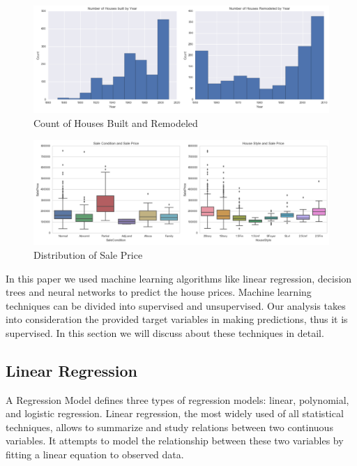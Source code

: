 \documentclass[fleqn,10pt]{SelfArx} %
\begin{document}
	\begin{figure}[ht]\centering %
		\includegraphics[width=\linewidth]{year}
		\caption{Count of Houses Built and Remodeled}
		\label{fig:year}
	\end{figure}
	\begin{figure}[ht]\centering %
		\includegraphics[width=\linewidth]{SalePrice}
		\caption{Distribution of Sale Price}
		\label{fig:SalePrice}
	\end{figure}
	
	In this paper we used machine learning algorithms like linear regression, decision trees and neural networks to predict the house prices. Machine learning techniques can be divided into supervised and unsupervised. Our analysis takes into consideration the provided target variables in making predictions, thus it is supervised. In this section we will discuss about these techniques in detail.
	
	\subsection{Linear Regression}
	
	A Regression Model defines three types of regression models: linear, polynomial, and logistic regression. Linear regression, the most widely used of all statistical techniques, allows to summarize and study relations between two continuous variables\cite{stat}. It attempts to model the relationship between these two variables by fitting a linear equation to observed data. \\
	
\end{document}
